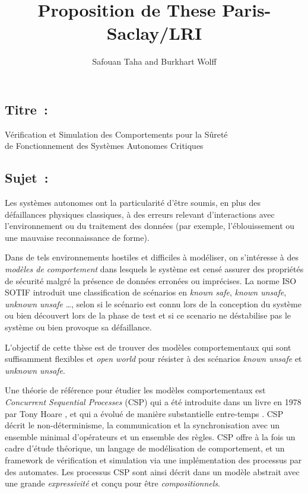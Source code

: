 \documentclass[a4paper,10pt]{article}
\begin{document}
\title{\textbf{Proposition de These Paris-Saclay/LRI}}
\author{Safouan Taha and Burkhart Wolff}
\date{}

\maketitle

\subsection*{Titre~:}
\begin{center}
\large Vérification et Simulation des Comportements pour la Sûreté \\ de Fonctionnement des Systèmes Autonomes Critiques
\end{center}

\subsection*{Sujet~:}
Les systèmes autonomes ont la particularité d'être soumis,
en plus des défaillances physiques classiques,
à des erreurs relevant d'interactions avec l'environnement
ou du traitement des données
(par exemple, l'éblouissement ou une mauvaise reconnaissance de forme).

Dans de tels environnements hostiles et difficiles à modéliser, on s'intéresse à des \emph{modèles de comportement} dans lesquels le système est censé assurer des propriétés de sécurité
malgré la présence de données erronées ou imprécises.
La norme ISO SOTIF introduit une classification de scénarios
en \emph{known safe}, \emph{known unsafe}, \emph{unknown unsafe} \ldots, selon si le scénario est connu lors de la conception du système ou bien découvert lors de la phase de test et si ce scenario ne déstabilise pas le système ou bien provoque sa défaillance.

L'objectif de cette thèse est de trouver des modèles comportementaux
qui sont suffisamment flexibles et \emph{open world}
pour résister à des scénarios \emph{known unsafe} et \emph{unknown unsafe}.

Une théorie de référence pour étudier les modèles comportementaux est
\emph{Concurrent Sequential Processes} (CSP) qui a été introduite dans un livre en 1978
par Tony Hoare \cite{Hoare:1985:CSP:3921}, et qui a évolué de manière substantielle
entre-temps \cite{BrookesHR84,brookes-roscoe85,roscoe:csp:1998}.
CSP décrit le non-déterminisme, la communication et la synchronisation avec un ensemble
minimal d'opérateurs et un ensemble des règles. CSP offre à la fois
un cadre d'étude théorique, un langage de modélisation de comportement, et un framework
de vérification et simulation via une implémentation des processus par des automates.
Les processus CSP sont ainsi décrit dans un modèle abstrait avec une grande \emph{expressivité} et conçu pour être \emph{compositionnels}.
\end{document}
